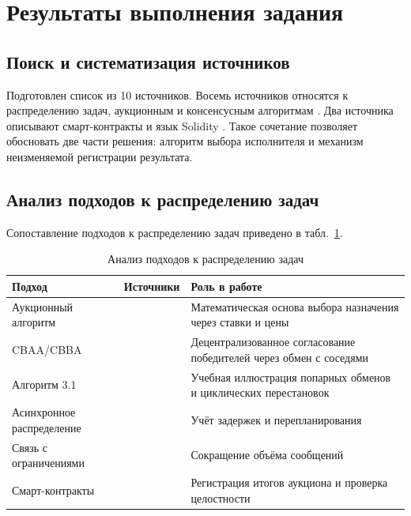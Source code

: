 \documentclass[14pt,a4paper]{extarticle}
\begin{document}
	\clearpage
	\section{Результаты выполнения задания}
	
	\subsection{Поиск и систематизация источников}
	
	Подготовлен список из 10 источников. Восемь источников относятся к распределению задач, аукционным и консенсусным алгоритмам \cite{choi2009,brunet2008,bertsekas1988,kalyaev2009,gerkey2004,dias2006,johnson2011,raja2022}. Два источника описывают смарт-контракты и язык Solidity \cite{buterin2014,solidity}. Такое сочетание позволяет обосновать две части решения: алгоритм выбора исполнителя и механизм неизменяемой регистрации результата.
	
	\subsection{Анализ подходов к распределению задач}
	
	Сопоставление подходов к распределению задач приведено в табл.~\ref{tab:approaches}.
	
	\begin{table}[htbp]
		\caption{Анализ подходов к распределению задач}
		\label{tab:approaches}
		\renewcommand{\arraystretch}{1.35}
		\begin{tabular}{|>{\centering\arraybackslash}p{4.2cm}|
				>{\centering\arraybackslash}p{2.6cm}|
				>{\centering\arraybackslash}p{6.7cm}|}
			\hline
			\textbf{Подход} & \textbf{Источники} & \textbf{Роль в работе} \\
			\hline
			Аукционный алгоритм & \cite{bertsekas1988} & Математическая основа выбора назначения через ставки и цены \\
			\hline
			CBAA/CBBA & \cite{choi2009,brunet2008} & Децентрализованное согласование победителей через обмен с соседями \\
			\hline
			Алгоритм 3.1 & \cite{kalyaev2009} & Учебная иллюстрация попарных обменов и циклических перестановок \\
			\hline
			Асинхронное распределение & \cite{johnson2011} & Учёт задержек и перепланирования \\
			\hline
			Связь с ограничениями & \cite{raja2022} & Сокращение объёма сообщений \\
			\hline
			Смарт-контракты & \cite{buterin2014,solidity} & Регистрация итогов аукциона и проверка целостности \\
			\hline
		\end{tabular}
	\end{table}
	
\end{document}
